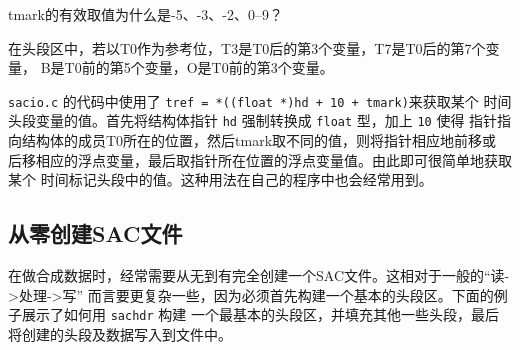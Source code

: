 \begin{note}
tmark的有效取值为什么是-5、-3、-2、0--9？

在头段区中，若以T0作为参考位，T3是T0后的第3个变量，T7是T0后的第7个变量，
B是T0前的第5个变量，O是T0前的第3个变量。

\texttt{sacio.c} 的代码中使用了 \verb|tref = *((float *)hd + 10 + tmark)|来获取某个
时间头段变量的值。首先将结构体指针 \texttt{hd} 强制转换成 \texttt{float} 型，加上 \texttt{10} 使得
指针指向结构体的成员T0所在的位置，然后tmark取不同的值，则将指针相应地前移或
后移相应的浮点变量，最后取指针所在位置的浮点变量值。由此即可很简单地获取某个
时间标记头段中的值。这种用法在自己的程序中也会经常用到。
\end{note}

\subsection{从零创建SAC文件}
在做合成数据时，经常需要从无到有完全创建一个SAC文件。这相对于一般的“读->处理->写”
而言要更复杂一些，因为必须首先构建一个基本的头段区。下面的例子展示了如何用 \texttt{sachdr} 构建
一个最基本的头段区，并填充其他一些头段，最后将创建的头段及数据写入到文件中。
\inputminted{C}{./sacio/write_sac.c}
